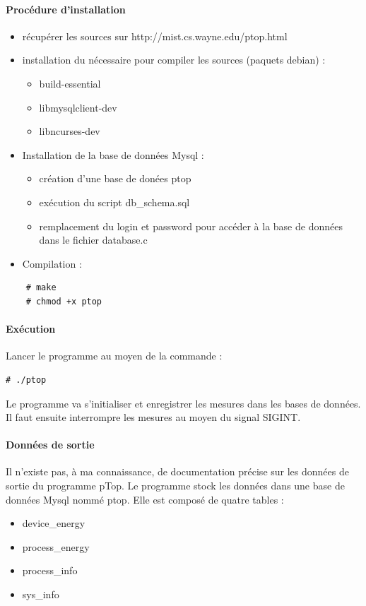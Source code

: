 \documentclass[a4paper, 11pt]{report}
\begin{document}
\paragraph{Procédure d'installation}
\begin{itemize}
    \item récupérer les sources sur http://mist.cs.wayne.edu/ptop.html
    \item installation du nécessaire pour compiler les sources (paquets debian) :
    \begin{itemize}
	\item build-essential
	\item libmysqlclient-dev
	\item libncurses-dev
    \end{itemize}
    \item Installation de la base de données Mysql :
    \begin{itemize}
	\item création d’une base de donées ptop
	\item exécution du script db\_schema.sql
	\item remplacement du login et password pour accéder à la base de données dans le fichier database.c
    \end{itemize}
    \item Compilation :
\end{itemize}

\begin{verbatim}
	# make
	# chmod +x ptop
\end{verbatim}

\paragraph{Exécution}
Lancer le programme au moyen de la commande :

\begin{verbatim}
# ./ptop
\end{verbatim}

Le programme va s'initialiser et enregistrer les mesures dans les bases de données. Il faut ensuite interrompre les mesures au moyen du signal SIGINT.

\paragraph{Données de sortie}
Il n’existe pas, à ma connaissance, de documentation précise sur les données de sortie du programme pTop.  Le programme stock les données dans une base de données Mysql nommé ptop. Elle est composé de quatre tables :
\begin{itemize}
	\item device\_energy
	\item process\_energy
	\item process\_info
	\item sys\_info
\end{itemize}
\end{document}
